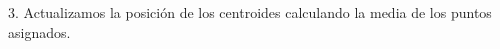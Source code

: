 \documentclass[preview]{standalone}
\begin{document}
\begin{center}
3. Actualizamos la posición de los centroides calculando la media de los puntos asignados.
\end{center}
\end{document}
